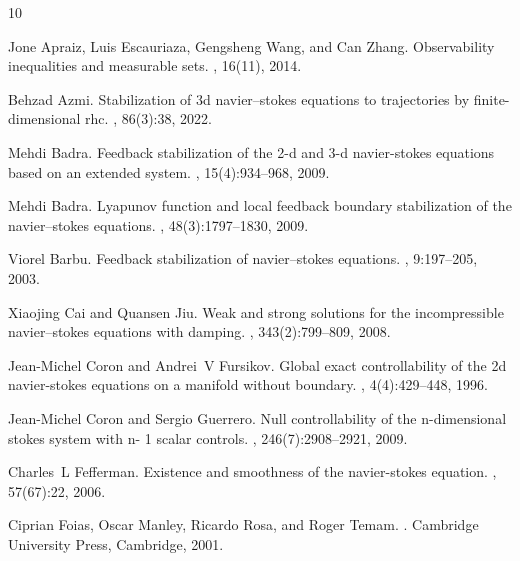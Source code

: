 \documentclass[preprint,12pt]{elsarticle}
\begin{document}
\begin{thebibliography}{10}

Jone Apraiz, Luis Escauriaza, Gengsheng Wang, and Can Zhang.
\newblock Observability inequalities and measurable sets.
, 16(11), 2014.

Behzad Azmi.
\newblock Stabilization of 3d navier--stokes equations to trajectories by finite-dimensional rhc.
, 86(3):38, 2022.

Mehdi Badra.
\newblock Feedback stabilization of the 2-d and 3-d navier-stokes equations based on an extended system.
, 15(4):934--968, 2009.

Mehdi Badra.
\newblock Lyapunov function and local feedback boundary stabilization of the navier--stokes equations.
, 48(3):1797--1830, 2009.

Viorel Barbu.
\newblock Feedback stabilization of navier--stokes equations.
, 9:197--205, 2003.

Xiaojing Cai and Quansen Jiu.
\newblock Weak and strong solutions for the incompressible navier--stokes equations with damping.
, 343(2):799--809, 2008.

Jean-Michel Coron and Andrei~V Fursikov.
\newblock Global exact controllability of the 2d navier-stokes equations on a manifold without boundary.
, 4(4):429--448, 1996.

Jean-Michel Coron and Sergio Guerrero.
\newblock Null controllability of the n-dimensional stokes system with n- 1 scalar controls.
, 246(7):2908--2921, 2009.

Charles~L Fefferman.
\newblock Existence and smoothness of the navier-stokes equation.
, 57(67):22, 2006.

Ciprian Foias, Oscar Manley, Ricardo Rosa, and Roger Temam.
.
\newblock Cambridge University Press, Cambridge, 2001.


\end{thebibliography}
\end{document}
